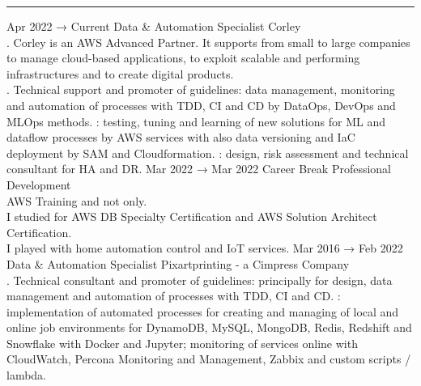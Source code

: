 \documentclass[9pt]{stackoverflow-upgraded-version} %
\begin{document}
\textcolor{stackoverflow}{\hrule}
\vspace{\baselineskip} %
\begin{entrylist}
	\entry
		{Apr 2022 → Current}
		{Data \& Automation Specialist}
		{Corley}
		{\\
		. Corley is an AWS Advanced Partner. It supports from small to large companies to manage cloud-based applications,
		to exploit scalable and performing infrastructures and to create digital products.\\
		. Technical support and promoter of guidelines: data management, monitoring and automation of processes with TDD, CI and CD by DataOps, DevOps and MLOps methods.
		: testing, tuning and learning of new solutions for ML and dataflow processes by AWS services with also data versioning and IaC deployment by SAM and Cloudformation.
		: design, risk assessment and technical consultant for HA and DR.}
	\entry
		{Mar 2022 → Mar 2022}
		{Career Break}
		{Professional Development}
		{\\
		AWS Training and not only.\\
		I studied for AWS DB Specialty Certification and AWS Solution Architect Certification.\\
		I played with home automation control and IoT services.}
	\entry
		{Mar 2016 → Feb 2022}
		{Data \& Automation Specialist}
		{Pixartprinting - a Cimpress Company}
		{\\
		. Technical consultant and promoter of guidelines: principally for design, data management and automation of processes with TDD, CI and CD.
		: implementation of automated processes for creating and managing of local and online job environments for DynamoDB, MySQL, MongoDB, Redis, Redshift and Snowflake with Docker and Jupyter; monitoring of services online with CloudWatch, Percona Monitoring and Management, Zabbix and custom scripts / lambda.
}
\end{entrylist}
\end{document}
